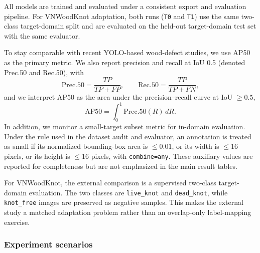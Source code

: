 \documentclass[10pt,a4paper]{article}
\begin{document}
All models are trained and evaluated under a consistent export and evaluation pipeline. For VNWoodKnot adaptation, both runs (\texttt{T0} and \texttt{T1}) use the same two-class target-domain split and are evaluated on the held-out target-domain test set with the same evaluator.

To stay comparable with recent YOLO-based wood-defect studies, we use AP50 as the primary metric. We also report precision and recall at IoU 0.5 (denoted Prec.50 and Rec.50), with
\begin{equation}
\mathrm{Prec.50} = \frac{TP}{TP + FP},
\qquad
\mathrm{Rec.50} = \frac{TP}{TP + FN},
\end{equation}
and we interpret AP50 as the area under the precision--recall curve at IoU $\geq 0.5$,
\begin{equation}
\mathrm{AP50} = \int_{0}^{1} \mathrm{Prec.50}(R)\, dR.
\end{equation}
In addition, we monitor a small-target subset metric for in-domain evaluation. Under the rule used in the dataset audit and evaluator, an annotation is treated as small if its normalized bounding-box area is $\leq 0.01$, or its width is $\leq 16$ pixels, or its height is $\leq 16$ pixels, with \texttt{combine=any}. These auxiliary values are reported for completeness but are not emphasized in the main result tables.

For VNWoodKnot, the external comparison is a supervised two-class target-domain evaluation. The two classes are \texttt{live\_knot} and \texttt{dead\_knot}, while \texttt{knot\_free} images are preserved as negative samples. This makes the external study a matched adaptation problem rather than an overlap-only label-mapping exercise.

\subsubsection{Experiment scenarios}
\end{document}
